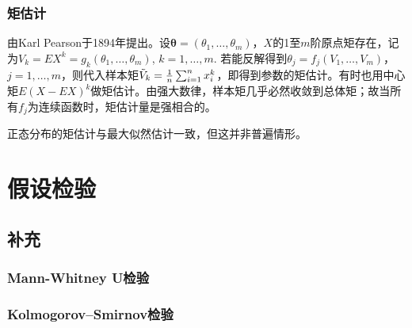 \subsubsection{矩估计}

\par 由Karl Pearson于1894年提出。设$\boldsymbol{\theta}=(\theta_1,\dots,\theta_m)$，$X$的1至$m$阶原点矩存在，记为$V_k=EX^k=g_k(\theta_1,\dots,\theta_m)$, $k=1,\dots,m$. 若能反解得到$\theta_j=f_j(V_1,\dots,V_m)$，$j=1,\dots,m$，则代入样本矩$\Tilde{V}_k=\frac{1}{n}\sum_{i=1}^n x_i^k$，即得到参数的矩估计。有时也用中心矩$E(X-EX)^k$做矩估计。由强大数律，样本矩几乎必然收敛到总体矩；故当所有$f_j$为连续函数时，矩估计量是强相合的。

\par 正态分布的矩估计与最大似然估计一致，但这并非普遍情形。

\section{假设检验}

\subsection{补充}

\subsubsection{Mann-Whitney U检验}

\subsubsection{Kolmogorov–Smirnov检验}